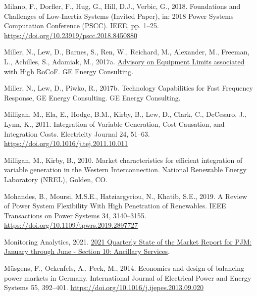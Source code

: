 \documentclass[12pt,a4paper,]{report}
\newlength{\cslhangindent}
\newenvironment{CSLReferences}[2] %
 {%
  \setlength{\parindent}{0pt}
  \ifodd #1 \everypar{\setlength{\hangindent}{\cslhangindent}}\ignorespaces\fi
  \ifnum #2 > 0
  \setlength{\parskip}{#2\baselineskip}
  \fi
 }%
 {}
\begin{document}
\begin{CSLReferences}{1}{0}
\leavevmode{}%
Milano, F., Dorfler, F., Hug, G., Hill, D.J., Verbic, G., 2018.
Foundations and {Challenges} of {Low-Inertia Systems} ({Invited Paper}),
in: 2018 {Power Systems Computation Conference} ({PSCC}). {IEEE}, pp.
1--25. \url{https://doi.org/10.23919/pscc.2018.8450880}

\leavevmode{}%
Miller, N., Lew, D., Barnes, S., Ren, W., Reichard, M., Alexander, M.,
Freeman, L., Achilles, S., Adamiak, M., 2017a.
\href{https://www.aemo.com.au/-/media/Files/Electricity/NEM/Security_and_Reliability/Reports/2017/20170904-GE-RoCoF-Advisory}{Advisory
on {Equipment Limits} associated with {High RoCoF}}. {GE Energy
Consulting}.

\leavevmode{}%
Miller, N., Lew, D., Piwko, R., 2017b. Technology {Capabilities} for
{Fast Frequency Response}, GE Energy Consulting. {GE Energy Consulting}.

\leavevmode{}%
Milligan, M., Ela, E., Hodge, B.M., Kirby, B., Lew, D., Clark, C.,
DeCesaro, J., Lynn, K., 2011. Integration of {Variable Generation},
{Cost-Causation}, and {Integration Costs}. Electricity Journal 24,
51--63. \url{https://doi.org/10.1016/j.tej.2011.10.011}

\leavevmode{}%
Milligan, M., Kirby, B., 2010. Market characteristics for efficient
integration of variable generation in the {Western Interconnection}.
{National Renewable Energy Laboratory (NREL)}, {Golden, CO}.

\leavevmode{}%
Mohandes, B., Moursi, M.S.E., Hatziargyriou, N., Khatib, S.E., 2019. A
{Review} of {Power System Flexibility With High Penetration} of
{Renewables}. IEEE Transactions on Power Systems 34, 3140--3155.
\url{https://doi.org/10.1109/tpwrs.2019.2897727}

\leavevmode{}%
Monitoring Analytics, 2021.
\href{https://www.monitoringanalytics.com/reports/PJM_State_of_the_Market/2021.shtml}{2021
{Quarterly State} of the {Market Report} for {PJM}: {January} through
{June} - {Section} 10: {Ancillary Services}}.

\leavevmode{}%
Müsgens, F., Ockenfels, A., Peek, M., 2014. Economics and design of
balancing power markets in {Germany}. International Journal of
Electrical Power and Energy Systems 55, 392--401.
\url{https://doi.org/10.1016/j.ijepes.2013.09.020}


\end{CSLReferences}
\end{document}
